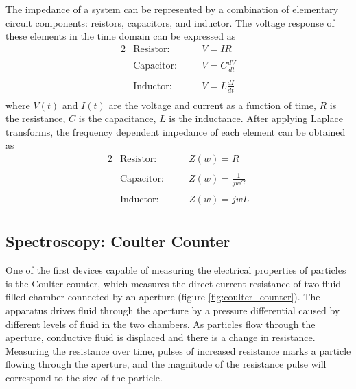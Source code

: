  \par The impedance of a system can be represented by a combination of elementary circuit components: reistors, capacitors, and inductor. The voltage response of these elements in the time domain can be expressed as
 \begin{alignat}{2}
    &\text{Resistor:} \quad  &&V = IR \label{eqn:ohms_law}\\\nonumber\\
    &\text{Capacitor:} \quad &&V = C \frac{dV}{dt}\\\nonumber\\
    &\text{Inductor:} \quad  &&V = L \frac{dI}{dt}\\\nonumber
 \end{alignat}
 \noindent where $V(t)$ and $I(t)$ are the voltage and current as a function of time, $R$ is the resistance, $C$ is the capacitance, $L$ is the inductance. After applying Laplace transforms, the frequency dependent impedance of each element can be obtained as
  \begin{alignat}{2}
    &\text{Resistor:} \quad  &&Z(w) = R \;\;\;\\\nonumber\\
    &\text{Capacitor:} \quad &&Z(w) = \frac{1}{jwC}\\\nonumber\\
    &\text{Inductor:} \quad  &&Z(w) = jwL\\\nonumber
 \end{alignat}

\subsection*{Spectroscopy: Coulter Counter}
\par One of the first devices capable of measuring the electrical properties of particles is the Coulter counter, which measures the direct current resistance of two fluid filled chamber connected by an aperture (figure \ref{fig:coulter_counter}). The apparatus drives fluid through the aperture by a pressure differential caused by different levels of fluid in the two chambers. As particles flow through the aperture, conductive fluid is displaced and there is a change in resistance. Measuring the resistance over time, pulses of increased resistance marks a particle flowing through the aperture, and the magnitude of the resistance pulse will correspond to the size of the particle. 


